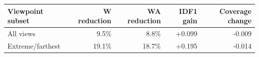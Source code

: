 \begin{tabular}{lrrrr}
\toprule
Viewpoint subset & W reduction & WA reduction & IDF1 gain & Coverage change \\
\midrule
All views & 9.5\% & 8.8\% & +0.099 & -0.009 \\
Extreme/farthest & 19.1\% & 18.7\% & +0.195 & -0.014 \\
\bottomrule
\end{tabular}
